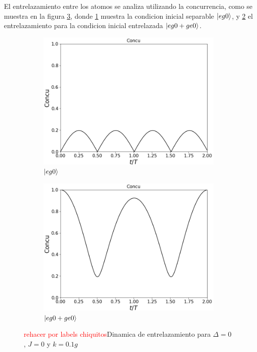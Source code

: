 El entrelazamiento entre los atomos se analiza utilizando la concurrencia, como se muestra en la figura \ref{fig4:concu k}, donde \ref{fig4:concu k eg0} muestra la condicion inicial separable $\ket{eg0}$, y \ref{fig4:concu k eg0 sim} el entrelazamiento para la condicion inicial entrelazada $\ket{eg0+ge0}$. 
\begin{figure}[h]
    \centering
    \begin{subfigure}{0.49\textwidth}
        \includegraphics[width=\textwidth]{figuras/ch4/k eg0 concu.png}
        \caption{$\ket{eg0}$}
        \label{fig4:concu k eg0}
    \end{subfigure}
    \hfill
    \begin{subfigure}{0.49\textwidth}
        \includegraphics[width=\textwidth]{figuras/ch4/k eg0+ concu.png}
        \caption{$\ket{eg0+ge0}$}
        \label{fig4:concu k eg0 sim}
    \end{subfigure}
    \caption{\textcolor{red}{rehacer por labels chiquitos}Dinamica de entrelazamiento para $\Delta=0$, $J=0$ y $k=0.1g$}
    \label{fig4:concu k}
\end{figure}

